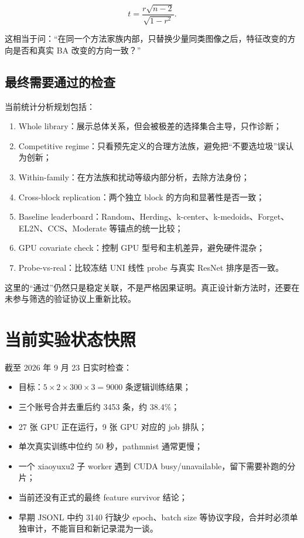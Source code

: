 \documentclass[UTF8,a4paper,12pt]{ctexart}
\begin{document}
\[
t=\frac{r\sqrt{n-2}}{\sqrt{1-r^2}}.
\]

这相当于问：“在同一个方法家族内部，只替换少量同类图像之后，特征改变的方向是否和真实 BA 改变的方向一致？”

\subsection{最终需要通过的检查}

当前统计分析规划包括：

\begin{enumerate}
  \item Whole library：展示总体关系，但会被极差的选择集合主导，只作诊断；
  \item Competitive regime：只看预先定义的合理方法族，避免把“不要选垃圾”误认为创新；
  \item Within-family：在方法族和扰动等级内部分析，去除方法身份；
  \item Cross-block replication：两个独立 block 的方向和显著性是否一致；
  \item Baseline leaderboard：Random、Herding、k-center、k-medoids、Forget、EL2N、CCS、Moderate 等锚点的统一比较；
  \item GPU covariate check：控制 GPU 型号和主机差异，避免硬件混杂；
  \item Probe-vs-real：比较冻结 UNI 线性 probe 与真实 ResNet 排序是否一致。
\end{enumerate}

这里的“通过”仍然只是稳定关联，不是严格因果证明。真正设计新方法时，还要在未参与筛选的验证协议上重新比较。

\section{当前实验状态快照}

截至 2026 年 9 月 23 日实时检查：

\begin{itemize}
  \item 目标：\(5\times2\times300\times3=9000\) 条逻辑训练结果；
  \item 三个账号合并去重后约 3453 条，约 38.4\%；
  \item 27 张 GPU 正在运行，9 张 GPU 对应的 job 排队；
  \item 单次真实训练中位约 50 秒，pathmnist 通常更慢；
  \item 一个 xiaoyuxu2 子 worker 遇到 CUDA busy/unavailable，留下需要补跑的分片；
  \item 当前还没有正式的最终 feature survivor 结论；
  \item 早期 JSONL 中约 3140 行缺少 epoch、batch size 等协议字段，合并时必须单独审计，不能盲目和新记录混为一谈。
\end{itemize}
\end{document}
